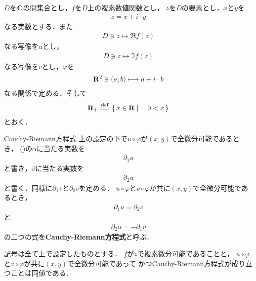 	$D$を$\mathbf{C}$の開集合とし，$f$を$D$上の複素数値関数とし，
	$z$を$D$の要素とし，$x$と$y$を
	\begin{align}
		z = x + i \cdot y
	\end{align}
	なる実数とする．また
	\begin{align}
		D \ni z \longmapsto \Re{f(z)}
	\end{align}
	なる写像を$u$とし，
	\begin{align}
		D \ni z \longmapsto \Im{f(z)}
	\end{align}
	なる写像を$v$とし，$\varphi$を
	\begin{align}
		\mathbf{R}^2 \ni (a,b) \longmapsto a + i \cdot b
	\end{align}
	なる関係で定める．そして
	\begin{align}
		\R_+ \defeq \Set{x \in \R}{0 < x}
	\end{align}
	とおく．
	
	\begin{itembox}[l]{Cauchy-Riemann方程式}
		上の設定の下で$u \circ \varphi$が$(x,y)$で全微分可能であるとき，
		()の$\alpha$に当たる実数を
		\begin{align}
			\partial_1 u
		\end{align}
		と書き，$\beta$に当たる実数を
		\begin{align}
			\partial_2 u
		\end{align}
		と書く．同様に$\partial_1 v$と$\partial_2 v$を定める．
		$u \circ \varphi$と$v \circ \varphi$が共に$(x,y)$で全微分可能であるとき，
		\begin{align}
			\partial_1 u = \partial_2 v
		\end{align}
		と
		\begin{align}
			\partial_2 u = -\partial_1 v
		\end{align}
		の二つの式を{\bf Cauchy-Riemann方程式}と呼ぶ．
	\end{itembox}
	
	\begin{screen}
		\begin{thm}
			記号は全て上で設定したものとする．
			$f$が$z$で複素微分可能であることと，
			$u \circ \varphi$と$v \circ \varphi$が共に$(x,y)$で全微分可能であって
			かつCauchy-Riemann方程式が成り立つことは同値である．
		\end{thm}
	\end{screen}
	
